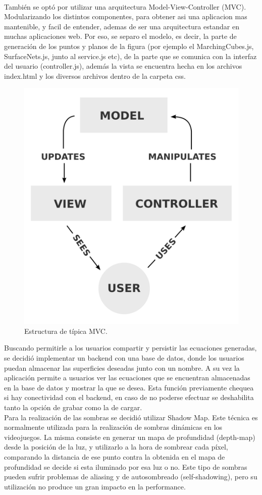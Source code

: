 \documentclass[12pt]{article}
\begin{document}
\\También se optó por utilizar una arquitectura Model-View-Controller (MVC). Modularizando los distintos componentes, para obtener asi una aplicacion mas mantenible, y facil de entender, ademas de ser una arquitectura estandar en muchas aplicaciones web. Por eso, se separo el modelo, es decir, la parte de generación de los puntos y planos de la figura (por ejemplo el MarchingCubes.js, SurfaceNets.js, junto al service.js etc), de la parte que se comunica con la interfaz del usuario (controller.js), además la vista se encuentra hecha en los archivos index.html y los diversos archivos dentro de la carpeta css.
\clearpage
\begin{figure}[h!]
\includegraphics[width =0.4\linewidth, center]{mvc.png}
\caption{Estructura de típica MVC.}
\label{ fig : surface }
\end{figure}
Buscando permitirle a los usuarios compartir y persistir las ecuaciones generadas, se decidió implementar un backend con una base de datos, donde los usuarios puedan almacenar las superficies deseadas junto con un nombre. A su vez la aplicación permite a usuarios ver las ecuaciones que se encuentran almacenadas en la base de datos y mostrar la que se desea. Esta función previamente chequea si hay conectividad con el backend, en caso de no poderse efectuar se deshabilita tanto la opción de grabar como la de cargar.
\\Para la realización de las sombras se decidió utilizar Shadow Map\cite{shadowmap}\cite{realtimerendering}. Este técnica es normalmente utilizada para la realización de sombras dinámicas en los videojuegos\cite{engine}\cite{realtimerendering}. La misma consiste en generar un mapa de profundidad (depth-map) desde la posición de la luz, y utilizarlo a la hora de sombrear cada píxel, comparando la distancia de ese punto contra la obtenida en el mapa de profundidad se decide si esta iluminado por esa luz o no. Este tipo de sombras pueden sufrir problemas de aliasing y de autosombreado (self-shadowing)\cite{realtimerendering}, pero su utilización no produce un gran impacto en la performance.
\end{document}
